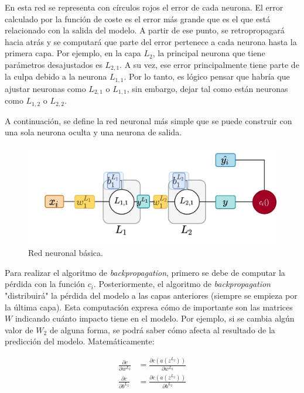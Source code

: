 En esta red se representa con círculos rojos el error de cada neurona. El error calculado por la función de coste es el error más grande que es el que está relacionado con la salida del modelo. A partir de ese punto, se retropropagará hacia atrás y se computará que parte del error pertenece a cada neurona hasta la primera capa. Por ejemplo, en la capa $L_2$, la principal neurona que tiene parámetros desajustados es $L_{2,1}$. A su vez, ese error principalmente tiene parte de la culpa debido a la neurona $L_{1,1}$. Por lo tanto, es lógico pensar que habría que ajustar neuronas como $L_{2,1}$ o $L_{1,1}$, sin embargo, dejar tal como están neuronas como $L_{1,2}$ o $L_{2,2}$.
\newline
 
A continuación, se define la red neuronal más simple que se puede construir con una sola neurona oculta y una neurona de salida.
\begin{figure}[H]
    \centering
    \includegraphics[width=12cm]{images/state-of-art/back-propagation/basic_network.png}
    \caption{Red neuronal básica.}
    \label{fig:basic_network}
\end{figure}

Para realizar el algoritmo de \textit{backpropagation}, primero se debe de computar la pérdida con la función $c_i$. Posteriormente, el algoritmo de \textit{backpropagation} "distribuirá" la pérdida del modelo a las capas anteriores (siempre se empieza por la última capa). Esta computación expresa cómo de importante son las matrices $W$ indicando cuánto impacto tiene en el modelo. Por ejemplo, si se cambia algún valor de $W_2$ de alguna forma, se podrá saber cómo afecta al resultado de la predicción del modelo. Matemáticamente:

\begin{equation}
\begin{split}
    \frac{\partial c}{\partial w^{L_2}} &= \frac{\partial c(a(z^{L_2}))}{\partial w^{L_2}} \\
    \frac{\partial c}{\partial b^{L_2}} &= \frac{\partial c(a(z^{L_2}))}{\partial b^{L_2}} 
    \label{eqn:backpropagationsimplenetworklayer2}
\end{split}
\end{equation}

